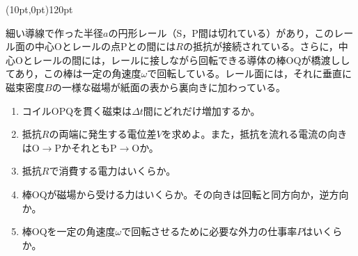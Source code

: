 \hakosyokika
\item
    \begin{mawarikomi}(10pt,0pt){120pt}{
        
    }
    細い導線で作った半径$a$の円形レール（S，P間は切れている）があり，このレール面の中心Oとレールの点Pとの間には$R$\tanni{\Omega }の抵抗が接続されている。さらに，中心Oとレールの間には，レールに接しながら回転できる導体の棒OQが橋渡ししてあり，この棒は一定の角速度$\omega $で回転している。レール面には，それに垂直に磁束密度$B$の一様な磁場が紙面の表から裏向きに加わっている。
        \begin{enumerate}
            \item コイルOPQを貫く磁束は$\varDelta t$間にどれだけ増加するか。
            \item 抵抗$R$\tanni{\Omega }の両端に発生する電位差$V$を求めよ。また，抵抗を流れる電流の向きはO$\rightarrow $PかそれともP$\rightarrow$Oか。
            \item 抵抗$R$\tanni{\Omega }で消費する電力はいくらか。
            \item 棒OQが磁場から受ける力はいくらか。その向きは回転と同方向か，逆方向か。
            \item 棒OQを一定の角速度$\omega $で回転させるために必要な外力の仕事率$P$はいくらか。
        \end{enumerate}
    \end{mawarikomi}